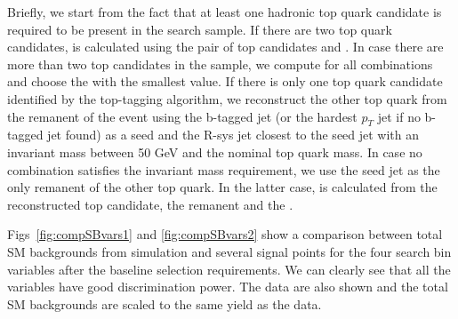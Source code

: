 Briefly, we start from the fact that at least one hadronic top quark candidate is required to be present in the search sample. 
If there are two top quark candidates, \MTTwo is calculated using the pair of top 
candidates and \MET. In case there are more than two top candidates
in the sample, we compute \MTTwo for all combinations and choose the 
\MTTwo with the smallest value. If there is only one top quark candidate identified
by the top-tagging algorithm, we reconstruct the other top 
quark from the remanent of the event using the b-tagged jet (or the hardest $p_{T}$ jet if no b-tagged jet found) as a seed and the R-sys 
jet closest to the seed jet with an invariant mass between 50 GeV and 
the nominal top quark mass. In case no combination satisfies the invariant mass
requirement, we use the seed jet as the only remanent of the other 
top quark. In the latter case, \MTTwo is calculated from the reconstructed top candidate, the remanent and the \MET.

Figs~\ref{fig:compSBvars1} and \ref{fig:compSBvars2} show a comparison between total SM backgrounds from simulation and several signal points for the four search bin variables after the baseline selection requirements. We can clearly see that all the variables have good discrimination power. The data are also shown and the total SM backgrounds are scaled to the same yield as the data.

